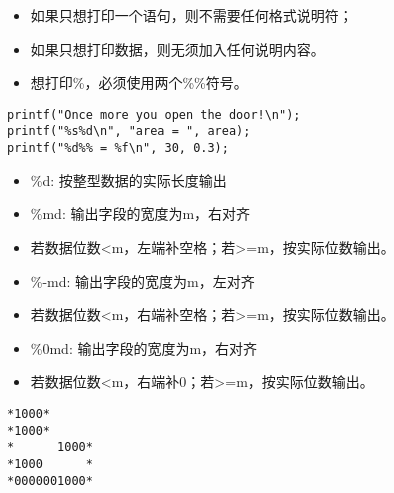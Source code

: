 \begin{frame}[fragile]\ft{\secname}
\begin{itemize}
\item 如果只想打印一个语句，则不需要任何格式说明符；\\[0.1in]
\item 如果只想打印数据，则无须加入任何说明内容。\\[0.1in]
\item 想打印\%，必须使用两个\%\%符号。
\end{itemize}

\begin{lstlisting}
printf("Once more you open the door!\n");
printf("%s%d\n", "area = ", area);
printf("%d%% = %f\n", 30, 0.3);
\end{lstlisting}
\end{frame}

\begin{frame}[fragile]
\begin{itemize}
\item \tf \%d:  按整型数据的实际长度输出\\[0.1in]
\item \%md:  输出字段的宽度为m，右对齐\\ 
\item[] 若数据位数<m，左端补空格；若>=m，按实际位数输出。\\[0.1in]
\item \%-md: 输出字段的宽度为m，左对齐\\ 
\item[] 若数据位数<m，右端补空格；若>=m，按实际位数输出。\\[0.1in]
\item \%0md: 输出字段的宽度为m，右对齐 \\ 
\item[] 若数据位数<m，右端补0；若>=m，按实际位数输出。
\end{itemize}
\end{frame}

\begin{frame}[fragile]

\end{frame}

\begin{frame}[fragile]
\begin{lstlisting}[showspaces=true,backgroundcolor=\color{red!20}]
*1000*
*1000*
*      1000*
*1000      *
*0000001000*
\end{lstlisting}
\end{frame}



